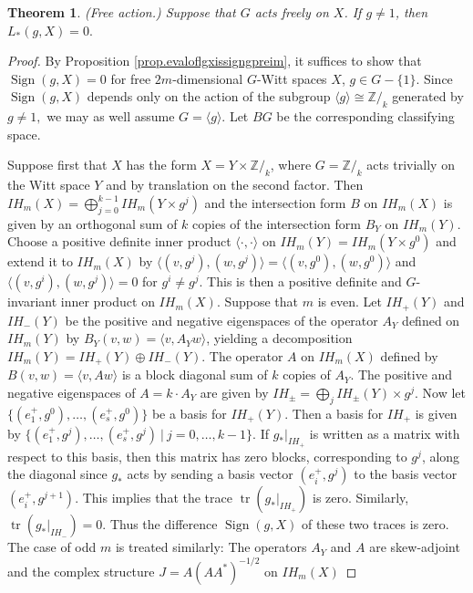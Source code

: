 \documentclass{amsart}
\newtheorem{thm}{Theorem}[section]
\theoremstyle{definition}
\theoremstyle{remark}
\newcommand {\intg}  {\ensuremath{\mathbb{Z}}}
\newcommand {\Sign}    {{\ensuremath{\operatorname{Sign}}}}
\newcommand {\tr}    {{\ensuremath{\operatorname{tr}}}}
\begin{document}
\begin{thm} \label{thm.freeaction}
(Free action.)
Suppose that $G$ acts freely on $X$.
If $g\not= 1$, then $L_* (g,X) =0.$
\end{thm}
\begin{proof}
By Proposition \ref{prop.evaloflgxissigngpreim}, it suffices to show
that $\Sign (g,X)=0$ for free $2m$-dimensional
$G$-Witt spaces $X$, $g\in G - \{ 1 \}$.
Since $\Sign (g,X)$ depends only on the action of the subgroup 
$\langle g \rangle \cong \intg/_k$ generated by $g\not= 1,$
we may as well assume $G = \langle g \rangle$.
Let $BG$ be the corresponding classifying space.

Suppose first that $X$ has the form $X= Y \times \intg/_k$,
where $G=\intg/_k$ acts trivially on the Witt space $Y$ and by
translation on the second factor.
Then $IH_m (X) = \bigoplus_{j=0}^{k-1} IH_m (Y \times g^j)$
and the intersection form $B$ on $IH_m (X)$ is given by an orthogonal sum
of $k$ copies of the intersection form $B_Y$ on $IH_m (Y)$.
Choose a positive definite inner product $\langle \cdot, \cdot \rangle$
on $IH_m (Y) = IH_m (Y\times g^0)$ and extend it to $IH_m (X)$
by 
$\langle (v, g^j), (w, g^j) \rangle = \langle (v,g^0), (w,g^0)  \rangle$
and $\langle (v, g^i), (w, g^j) \rangle = 0$ for $g^i \not= g^j.$
This is then a positive definite and $G$-invariant inner product
on $IH_m (X)$. Suppose that $m$ is even.
Let $IH_+ (Y)$ and $IH_- (Y)$ be the positive and negative eigenspaces
of the operator $A_Y$ defined on $IH_m (Y)$ by 
$B_Y (v,w) = \langle v, A_Y w \rangle$, yielding a decomposition
$IH_m (Y) = IH_+ (Y) \oplus IH_- (Y)$.
The operator $A$ on $IH_m (X)$
defined by $B (v,w) = \langle v, A w \rangle$
is a block diagonal sum of $k$ copies of $A_Y$. 
The positive and negative eigenspaces of $A = k\cdot A_Y$
are given by
$IH_\pm = \bigoplus_j IH_\pm (Y) \times g^j$.
Now let $\{ (e^+_1, g^0),\ldots,  (e^+_s, g^0) \}$ be a basis for $IH_+ (Y)$.
Then a basis for $IH_+$ is given by
$\{ (e^+_1, g^j),\ldots,  (e^+_s, g^j) ~|~ j=0,\ldots, k-1  \}.$
If $g_*|_{IH_+}$ is written as a matrix with respect to this basis,
then this matrix has zero blocks, corresponding to $g^j$, along the
diagonal since $g_*$ acts by sending a basis vector $(e^+_i, g^j)$ to 
the basis vector $(e^+_i, g^{j+1})$.
This implies that the trace $\tr (g_*|_{IH_+})$ is zero.
Similarly,  $\tr (g_*|_{IH_-})=0$. Thus the difference $\Sign (g,X)$
of these two traces is zero.
The case of odd $m$ is treated similarly:
The operators $A_Y$ and $A$ are skew-adjoint and
the complex structure $J = A (AA^*)^{-1/2}$ on $IH_m (X)$

\end{proof}
\end{document}

